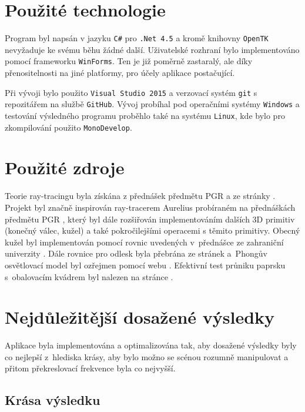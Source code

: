 \documentclass[12pt,a4paper,titlepage,final]{report}
\begin{document}
\chapter{Použité technologie}
Program byl napsán v jazyku \texttt{C\#} pro \texttt{.Net 4.5} a kromě knihovny \texttt{OpenTK} nevyžaduje ke svému běhu žádné další. Uživatelské rozhraní bylo implementováno pomocí frameworku \texttt{WinForms}. Ten je již poměrně zastaralý, ale díky přenositelnosti na jiné platformy, pro účely aplikace postačující.

Při vývoji bylo použito \texttt{Visual Studio 2015} a verzovací systém \texttt{git} s repozitářem na službě \texttt{GitHub}. Vývoj probíhal pod operačními systémy \texttt{Windows} a testování výsledného programu proběhlo také na systému \texttt{Linux}, kde bylo pro zkompilování použito \texttt{MonoDevelop}.


\begingroup
\let\clearpage\relax
\chapter{Použité zdroje}
Teorie ray-tracingu byla získána z přednášek předmětu PGR a ze stránky \cite{scratchapixel}. Projekt byl značně inspirován ray-tracerem Aurelius probíraném na přednáškách předmětu PGR \cite{aurelius}, který byl dále rozšiřován implementováním dalších 3D primitiv (konečný válec, kužel) a také pokročilejšími operacemi s těmito primitivy. Obecný kužel byl implementován pomocí rovnic uvedených v~přednášce ze zahraniční univerzity \cite{cone}. Dále rovnice pro odlesk byla přebrána ze stránek \cite{reflect} a~Phongův osvětlovací model byl ozřejmen pomocí webu \cite{phong}. Efektivní test průniku paprsku s~obalovacím kvádrem byl nalezen na stránce \cite{aabb}.

\endgroup

\chapter{Nejdůležitější dosažené výsledky}
Aplikace byla implementována a optimalizována tak, aby dosažené výsledky byly co nejlepší z~hlediska krásy, aby bylo možno se scénou rozumně manipulovat a přitom překreslovací frekvence byla co nejvyšší.

\section{Krása výsledku}
\end{document}
